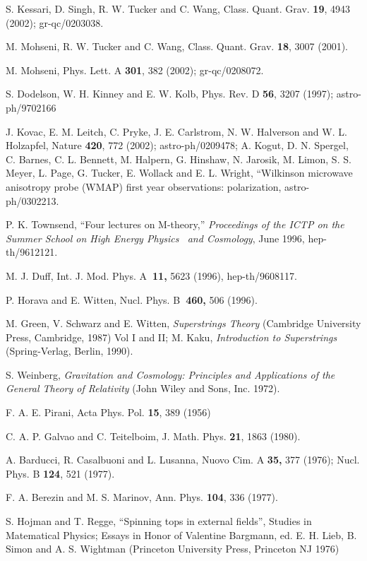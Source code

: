 \documentclass[a4paper,12pt]{article}
\begin{document}
\begin{thebibliography}{99}
  S. Kessari, D. Singh, R. W. Tucker and C. Wang, Class. Quant.
Grav. \textbf{19}, 4943 (2002); gr-qc/0203038.

  M. Mohseni, R. W. Tucker and C. Wang, Class. Quant. Grav. 
\textbf{18}, 3007 (2001).

  M. Mohseni, Phys. Lett. A \textbf{301}, 382 (2002);
gr-qc/0208072.

  S. Dodelson, W. H. Kinney and E. W. Kolb, Phys. Rev. D \textbf{%
56}, 3207 (1997); astro-ph/9702166

  J. Kovac, E. M. Leitch, C. Pryke, J. E. Carlstrom, N. W.
Halverson and W. L. Holzapfel, Nature \textbf{420}, 772 (2002);
astro-ph/0209478; A. Kogut, D. N. Spergel, C. Barnes, C. L. Bennett, M.
Halpern, G. Hinshaw, N. Jarosik, M. Limon, S. S. Meyer, L. Page, G. Tucker,
E. Wollack and E. L. Wright, ``Wilkinson microwave anisotropy probe (WMAP)
first year observations: polarization, astro-ph/0302213.

  P. K. Townsend, ``Four lectures on M-theory,'' \textit{%
Proceedings of the ICTP on the Summer School on High Energy Physics \ and
Cosmology}, June 1996, hep-th/9612121.

  M. J. Duff, Int. J. Mod. Phys. A\textbf{\ 11,} 5623 (1996),
hep-th/9608117.

  P. Horava and E. Witten, Nucl. Phys. B\textbf{\ 460,} 506
(1996).

  M. Green, V. Schwarz and E. Witten, \textit{Superstrings Theory%
} (Cambridge University Press, Cambridge, 1987) Vol I and II; M. Kaku, 
\textit{Introduction to Superstrings} (Spring-Verlag, Berlin, 1990).

  S. Weinberg, \textit{Gravitation and Cosmology: Principles and
Applications of the General Theory of Relativity }(John Wiley and Sons, Inc.
1972).

  F. A. E. Pirani, Acta Phys. Pol. \textbf{15}, 389 (1956)

  C. A. P. Galvao and C. Teitelboim, J. Math. Phys. \textbf{21},
1863 (1980).

  A. Barducci, R. Casalbuoni and L. Lusanna, Nuovo Cim. A 
\textbf{35, }377 (1976); Nucl. Phys. B \textbf{124}, 521 (1977).

  F. A. Berezin and M. S. Marinov, Ann. Phys. \textbf{104}, 336
(1977).

  S. Hojman and T. Regge, ``Spinning tops in external fields'',
Studies in Matematical Physics; Essays in Honor of Valentine Bargmann, ed.
E. H. Lieb, B. Simon and A. S. Wightman (Princeton University Press,
Princeton NJ 1976)


\end{thebibliography}
\end{document}
